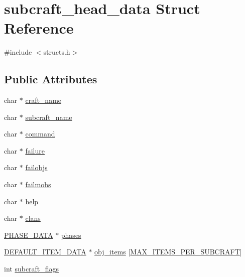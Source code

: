\hypertarget{structsubcraft__head__data}{\section{subcraft\-\_\-head\-\_\-data Struct Reference}
\label{structsubcraft__head__data}
}


{\ttfamily \#include $<$structs.\-h$>$}

\subsection*{Public Attributes}
\begin{DoxyCompactItemize}
\item 
char $\ast$ \hyperlink{structsubcraft__head__data_a3fbb279248041651dd873c7c7265a36b}{craft\-\_\-name}
\item 
char $\ast$ \hyperlink{structsubcraft__head__data_a011bfa753e34f34f50f725cdb16601a8}{subcraft\-\_\-name}
\item 
char $\ast$ \hyperlink{structsubcraft__head__data_a7bfeebd0a550e80e15c46cfd4b6548d9}{command}
\item 
char $\ast$ \hyperlink{structsubcraft__head__data_a5686d182f49445e674c7d24db72df3c0}{failure}
\item 
char $\ast$ \hyperlink{structsubcraft__head__data_a325350eb5d9bfb322c3e306ef9a858f0}{failobjs}
\item 
char $\ast$ \hyperlink{structsubcraft__head__data_a67698fc5060906c45979b28bac24a0cf}{failmobs}
\item 
char $\ast$ \hyperlink{structsubcraft__head__data_a71a8c68691ee6c65a645f3fafc8b5b8a}{help}
\item 
char $\ast$ \hyperlink{structsubcraft__head__data_a1825e41c58bf7d3eb3d0f84f6f439c35}{clans}
\item 
\hyperlink{structs_8h_a946fd03f2da414ee020673d226fbae22}{P\-H\-A\-S\-E\-\_\-\-D\-A\-T\-A} $\ast$ \hyperlink{structsubcraft__head__data_a4a9bb7499c38bbf7cbdb058af3730368}{phases}
\item 
\hyperlink{structs_8h_a0d3564d2558ddecb8307de195707d292}{D\-E\-F\-A\-U\-L\-T\-\_\-\-I\-T\-E\-M\-\_\-\-D\-A\-T\-A} $\ast$ \hyperlink{structsubcraft__head__data_a9ff897339a8a2b76583e84dac02527e7}{obj\-\_\-items} \mbox{[}\hyperlink{structs_8h_aae5dc301d156382191adc8f9abe7b4e0}{M\-A\-X\-\_\-\-I\-T\-E\-M\-S\-\_\-\-P\-E\-R\-\_\-\-S\-U\-B\-C\-R\-A\-F\-T}\mbox{]}
\item 
int \hyperlink{structsubcraft__head__data_a5f1abb33f003ee3237e0f21d688c88c3}{subcraft\-\_\-flags}

\end{DoxyCompactItemize}
